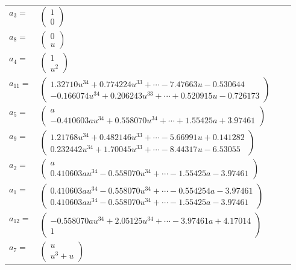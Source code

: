 \documentclass[1p]{elsarticle_modified}
\theoremstyle{definition}
\begin{document}
\begin{tabular}{m{7pt} m{180pt} m{7pt} m{180pt} }
\flushright $a_{3}=$&$\begin{pmatrix}1\\0\end{pmatrix}$ \\
\flushright $a_{8}=$&$\begin{pmatrix}0\\u\end{pmatrix}$ \\
\flushright $a_{4}=$&$\begin{pmatrix}1\\u^2\end{pmatrix}$ \\
\flushright $a_{11}=$&$\begin{pmatrix}1.32710 u^{34}+0.774224 u^{33}+\cdots-7.47663 u-0.530644\\-0.166074 u^{34}+0.206243 u^{33}+\cdots+0.520915 u-0.726173\end{pmatrix}$ \\
\flushright $a_{5}=$&$\begin{pmatrix}a\\-0.410603 a u^{34}+0.558070 u^{34}+\cdots+1.55425 a+3.97461\end{pmatrix}$ \\
\flushright $a_{9}=$&$\begin{pmatrix}1.21768 u^{34}+0.482146 u^{33}+\cdots-5.66991 u+0.141282\\0.232442 u^{34}+1.70045 u^{33}+\cdots-8.44317 u-6.53055\end{pmatrix}$ \\
\flushright $a_{2}=$&$\begin{pmatrix}a\\0.410603 a u^{34}-0.558070 u^{34}+\cdots-1.55425 a-3.97461\end{pmatrix}$ \\
\flushright $a_{1}=$&$\begin{pmatrix}0.410603 a u^{34}-0.558070 u^{34}+\cdots-0.554254 a-3.97461\\0.410603 a u^{34}-0.558070 u^{34}+\cdots-1.55425 a-3.97461\end{pmatrix}$ \\
\flushright $a_{12}=$&$\begin{pmatrix}-0.558070 a u^{34}+2.05125 u^{34}+\cdots-3.97461 a+4.17014\\1\end{pmatrix}$ \\
\flushright $a_{7}=$&$\begin{pmatrix}u\\u^3+u\end{pmatrix}$ \\

\end{tabular}
\end{document}
